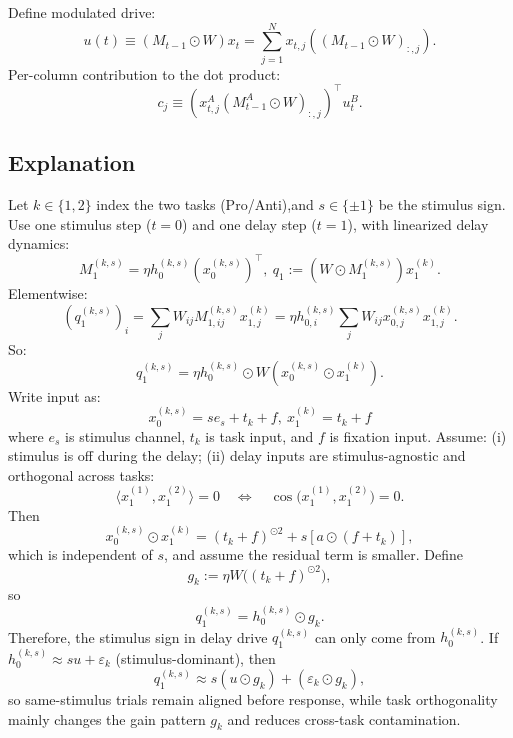 \documentclass{article}
\begin{document}
Define modulated drive:
\begin{equation}
    u(t) \equiv (M_{t-1} \odot W) x_t = \sum_{j=1}^N x_{t,j}((M_{t-1}\odot W)_{:,j}).
\end{equation}
Per-column contribution to the dot product:
\begin{equation}
    c_j \equiv (x_{t,j}^A(M_{t-1}^A \odot W)_{:,j})^{\top}u_t^B.
\end{equation}

\subsection{Explanation}
Let $k \in \{1,2\}$ index the two tasks (Pro/Anti),and $s \in \{\pm 1\}$ be the stimulus sign.
Use one stimulus step ($t=0$) and one delay step ($t=1$), with linearized delay dynamics:
\begin{equation}
    M_1^{(k,s)} = \eta h_0^{(k,s)} (x_0^{(k,s)})^{\top}, \ q_1 := (W \odot M_1^{(k,s)}) x_1^{(k)}.
\end{equation}
Elementwise:
\begin{equation}
    (q_1^{(k,s)})_i = \sum_j W_{ij}M_{1,ij}^{(k,s)}x_{1,j}^{(k)} = \eta h_{0,i}^{(k,s)} \sum_{j}W_{ij} x_{0,j}^{(k,s)} x_{1,j}^{(k)}.
\end{equation}
So:
\begin{equation}
    q_1^{(k,s)} = \eta h_0^{(k,s)} \odot W(x_0^{(k,s)} \odot x_1^{(k)}).
\end{equation}
Write input as:
\begin{equation}
    x_0^{(k,s)} = s e_s + t_k + f, \ x_1^{(k)} = t_k + f
\end{equation}
where $e_s$ is stimulus channel, $t_k$ is task input, and $f$ is fixation input. Assume: (i) stimulus is off during the delay; (ii) delay inputs are stimulus-agnostic and orthogonal across tasks:
\begin{equation}
    \langle x_1^{(1)},x_1^{(2)}\rangle=0
    \quad\Longleftrightarrow\quad
    \cos\!\big(x_1^{(1)},x_1^{(2)}\big)=0.
\end{equation}
Then
\begin{equation}
    x_0^{(k,s)}\odot x_1^{(k)}=(t_k+f)^{\odot2} + s[a \odot (f+t_k)],
\end{equation}
which is independent of $s$, and assume the residual term is smaller. Define
\begin{equation}
g   _k:=\eta W\!\big((t_k+f)^{\odot2}\big),
\end{equation}
so
\begin{equation}
    q_1^{(k,s)}=h_0^{(k,s)}\odot g_k.
\end{equation}
Therefore, the stimulus sign in delay drive $q_1^{(k,s)}$ can only come from $h_0^{(k,s)}$.
If $h_0^{(k,s)}\approx s u+\varepsilon_k$ (stimulus-dominant), then
\begin{equation}
    q_1^{(k,s)}\approx s (u\odot g_k)+(\varepsilon_k\odot g_k),
\end{equation}
so same-stimulus trials remain aligned before response, while task orthogonality mainly changes the gain pattern $g_k$ and reduces cross-task contamination.
\end{document}
